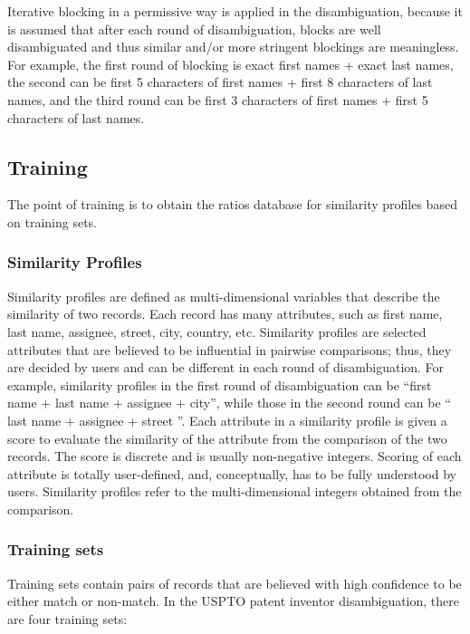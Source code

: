 \documentclass{article}
\begin{document}
Iterative blocking in a permissive way is applied in the 
disambiguation, because it is assumed that after each round 
of disambiguation, blocks are well disambiguated and thus 
similar and/or more stringent blockings are meaningless. 
For example, the first round of blocking is exact 
first names + exact last names, the second can 
be first 5 characters of first names + first 8 characters 
of last names, and the third round can be first 
3 characters of first names + first 5 characters of last names.


\subsection{Training}

The point of training is to obtain the ratios database for 
similarity profiles based on training sets.

\subsubsection{Similarity Profiles}

Similarity profiles are defined as multi-dimensional variables 
that describe the similarity of two records. Each record has 
many attributes, such as first name, last name, assignee, street, 
city, country, etc. Similarity profiles are selected attributes 
that are believed to be influential in pairwise comparisons; thus, 
they are decided by users and can be different in each round of 
disambiguation. For example, similarity profiles in the first round 
of disambiguation can be “first name + last name + assignee + 
city”, while those in the second round can be “ last name + 
assignee + street ”. Each attribute in a similarity profile is 
given a score to evaluate the similarity of the attribute from the
comparison of the two records. The score is discrete and is usually 
non-negative integers. Scoring of each attribute is totally 
user-defined, and, conceptually, has to be fully understood by users.
Similarity profiles refer to the multi-dimensional integers obtained 
from the comparison.



\subsubsection{Training sets}

Training sets contain pairs of records that are believed 
with high confidence to be either match or
non-match. In the USPTO patent inventor disambiguation, 
there are four training sets:
\end{document}
